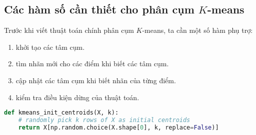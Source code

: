 








\subsection{Các hàm số cần thiết cho phân cụm $K$-means }
Trước khi viết thuật toán chính phân cụm $K$-means, ta cần một số hàm phụ
trợ:
\begin{enumerate}
\item {} khởi tạo các tâm cụm.

\item {} tìm nhãn mới cho các điểm khi
biết các tâm cụm.

\item {} cập nhật các tâm cụm khi
biết nhãn của từng điểm.

\item {} kiểm tra điều kiện dừng của thuật toán.
\end{enumerate}


\begin{lstlisting}[language=Python]
def kmeans_init_centroids(X, k):
    # randomly pick k rows of X as initial centroids
    return X[np.random.choice(X.shape[0], k, replace=False)]
\end{lstlisting}


